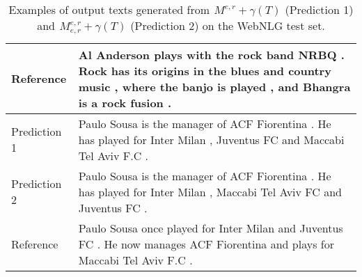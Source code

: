 \documentclass[11pt]{article}
\begin{document}
\begin{table*}[]
\begin{tabular}{l|p{13cm}}
Reference     & Al Anderson plays with the rock band NRBQ . Rock has its origins in the blues and country music , where the banjo is played , and Bhangra is a rock fusion .                  \\ \midrule[2pt]
Prediction 1 & Paulo Sousa is the manager of ACF Fiorentina . He has played for Inter Milan , Juventus FC and Maccabi Tel Aviv F.C .                                                         \\ \hline
Prediction 2 & Paulo Sousa is the manager of ACF Fiorentina . He has played for Inter Milan , Maccabi Tel Aviv FC and Juventus FC .                                                          \\ \hline
Reference     & Paulo Sousa once played for Inter Milan and Juventus FC . He now manages ACF Fiorentina and plays for Maccabi Tel Aviv F.C .                                                  \\ \midrule[2pt]
\end{tabular}\caption{\label{tab:ExamplesWebNLG} Examples of output texts generated from $ {}^{}_{}M^{e,r}_{} + \gamma(T)$ (Prediction 1) and $ {}^{}_{}M^{e,r}_{e,r} + \gamma(T)$ (Prediction 2) on the WebNLG test set. }
\end{table*}
\end{document}
